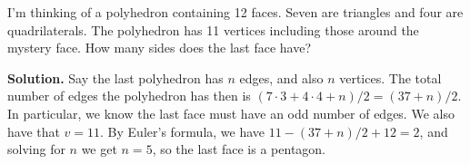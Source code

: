 \documentclass{book}
\begin{document}
\setcounter{project}{33}
\addtocounter{project}{-1}
\begin{activity}[]\label{activity-28}
\hypertarget{p-322}{}%
I'm thinking of a polyhedron containing 12 faces. Seven are triangles and four are quadrilaterals. The polyhedron has 11 vertices including those around the mystery face. How many sides does the last face have?%
\par\smallskip%
\noindent\textbf{Solution.}\hypertarget{solution-25}{}\quad%
\hypertarget{p-323}{}%
Say the last polyhedron has \(n\) edges, and also \(n\) vertices. The total number of edges the polyhedron has then is \((7 \cdot 3 + 4 \cdot 4 + n)/2 = (37 + n)/2\). In particular, we know the last face must have an odd number of edges. We also have that \(v = 11 \).  By Euler's formula, we have \(11 - (37+n)/2 + 12 = 2\), and solving for \(n\) we get \(n = 5\), so the last face is a pentagon.%
\end{activity}

\clearpage
\end{document}
